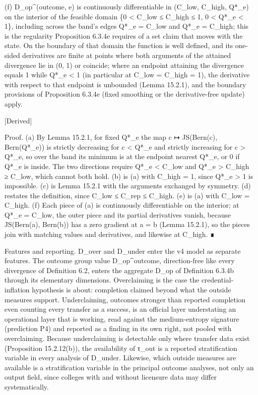 \documentclass[
]{article}
\begin{document}
(f) D\_op\^{}(outcome, e) is continuously differentiable in (C\_low,
C\_high, Q*\_e) on the interior of the feasible domain \{0 \textless{}
C\_low ≤ C\_high ≤ 1, 0 \textless{} Q*\_e \textless{} 1\}, including
across the band's edges Q*\_e = C\_low and Q*\_e = C\_high; this is the
regularity Proposition 6.3.4e requires of a set claim that moves with
the state. On the boundary of that domain the function is well defined,
and its one-sided derivatives are finite at points where both arguments
of the attained divergence lie in (0, 1) or coincide; where an endpoint
attaining the divergence equals 1 while Q*\_e \textless{} 1 (in
particular at C\_low = C\_high = 1), the derivative with respect to that
endpoint is unbounded (Lemma 15.2.1), and the boundary provisions of
Proposition 6.3.4e (fixed smoothing or the derivative-free update)
apply.

{[}Derived{]}

Proof. (a) By Lemma 15.2.1, for fixed Q*\_e the map c ↦ JS(Bern(c),
Bern(Q*\_e)) is strictly decreasing for c \textless{} Q*\_e and strictly
increasing for c \textgreater{} Q*\_e, so over the band its minimum is
at the endpoint nearest Q*\_e, or 0 if Q*\_e is inside. The two
directions require Q*\_e \textless{} C\_low and Q*\_e \textgreater{}
C\_high ≥ C\_low, which cannot both hold. (b) is (a) with C\_high = 1,
since Q*\_e \textgreater{} 1 is impossible. (c) is Lemma 15.2.1 with the
arguments exchanged by symmetry. (d) restates the definition, since
C\_low ≤ C\_rep ≤ C\_high. (e) is (a) with C\_low = C\_high. (f) Each
piece of (a) is continuously differentiable on the interior; at Q*\_e =
C\_low, the outer piece and its partial derivatives vanish, because
JS(Bern(a), Bern(b)) has a zero gradient at a = b (Lemma 15.2.1), so the
pieces join with matching values and derivatives, and likewise at
C\_high. ∎

Features and reporting. D\_over and D\_under enter the v4 model as
separate features. The outcome group value D\_op\^{}outcome,
direction-free like every divergence of Definition 6.2, enters the
aggregate D\_op of Definition 6.3.4b through its elementary dimensions.
Overclaiming is the case the credential-inflation hypothesis is about:
completion claimed beyond what the outside measures support.
Underclaiming, outcomes stronger than reported completion even counting
every transfer as a success, is an official layer understating an
operational layer that is working, read against the medium-entropy
signature (prediction P4) and reported as a finding in its own right,
not pooled with overclaiming. Because underclaiming is detectable only
where transfer data exist (Proposition 15.2.12(b)), the availability of
τ\_out is a reported stratification variable in every analysis of
D\_under. Likewise, which outside measures are available is a
stratification variable in the principal outcome analyses, not only an
output field, since colleges with and without licensure data may differ
systematically.
\end{document}
